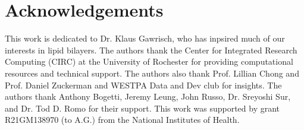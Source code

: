 \documentclass{biophys-new}
\begin{document}
\section*{Acknowledgements}

This work is dedicated to Dr. Klaus Gawrisch, who has inpsired much of our interests in lipid bilayers. The authors thank the Center for Integrated Research Computing (CIRC) at the University of Rochester for providing
computational resources and technical support. The authors also thank Prof. Lillian Chong and Prof. Daniel Zuckerman and
WESTPA Data and Dev club for insights. The authors thank Anthony Bogetti, Jeremy Leung, John Russo, Dr. Sreyoshi Sur, and Dr. Tod D. Romo for their support.
This work was supported by grant R21GM138970 (to A.G.) from the National Institutes of Health.



\end{document}
